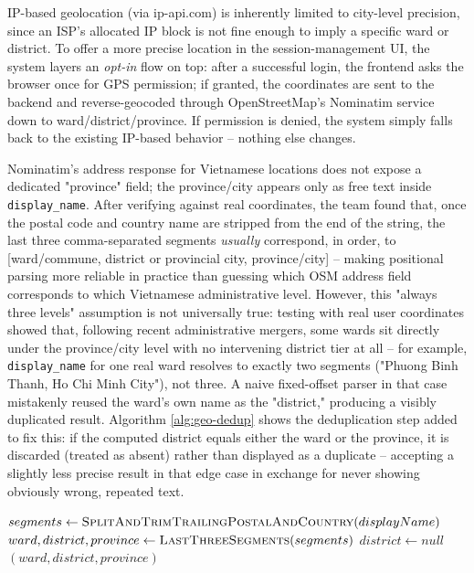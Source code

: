 \documentclass[12pt,a4paper]{report}
\begin{document}
IP-based geolocation (via ip-api.com) is inherently limited to
city-level precision, since an ISP's allocated IP block is not fine
enough to imply a specific ward or district. To offer a more precise
location in the session-management UI, the system layers an
\emph{opt-in} flow on top: after a successful login, the frontend asks
the browser once for GPS permission; if granted, the coordinates are
sent to the backend and reverse-geocoded through OpenStreetMap's
Nominatim service down to ward/district/province. If permission is
denied, the system simply falls back to the existing IP-based
behavior -- nothing else changes.

Nominatim's address response for Vietnamese locations does not expose a
dedicated "province" field; the province/city appears only as free text
inside \texttt{display\_name}. After verifying against real
coordinates, the team found that, once the postal code and country
name are stripped from the end of the string, the last three
comma-separated segments \emph{usually} correspond, in order, to
[ward/commune, district or provincial city, province/city] -- making
positional parsing more reliable in practice than guessing which OSM
address field corresponds to which Vietnamese administrative level.
However, this "always three levels" assumption is not universally true:
testing with real user coordinates showed that, following recent
administrative mergers, some wards sit directly under the
province/city level with no intervening district tier at all -- for
example, \texttt{display\_name} for one real ward resolves to exactly
two segments ("Phuong Binh Thanh, Ho Chi Minh City"), not three. A naive
fixed-offset parser in that case mistakenly reused the ward's own name
as the "district," producing a visibly duplicated result. Algorithm
\ref{alg:geo-dedup} shows the deduplication step added to fix this: if
the computed district equals either the ward or the province, it is
discarded (treated as absent) rather than displayed as a duplicate --
accepting a slightly less precise result in that edge case in exchange
for never showing obviously wrong, repeated text.

\begin{algorithm}[htbp]
\caption{Reverse-Geocoded Address Deduplication}
\label{alg:geo-dedup}
\begin{algorithmic}[1]
  \State $segments \gets \Call{SplitAndTrimTrailingPostalAndCountry}{displayName}$
  \State $ward, district, province \gets \Call{LastThreeSegments}{segments}$
    \State $district \gets null$ 
  \EndIf
  \State \Return $(ward, district, province)$
\EndProcedure
\end{algorithmic}
\end{algorithm}
\end{document}
